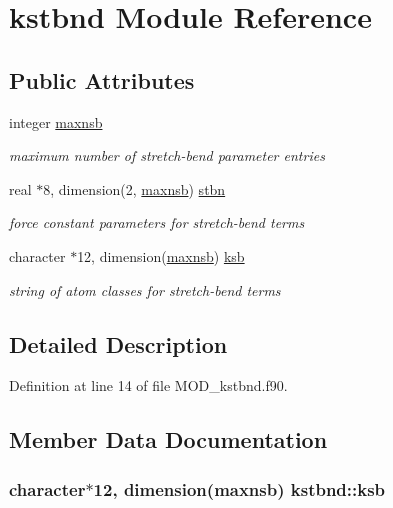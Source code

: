 \hypertarget{classkstbnd}{\section{kstbnd Module Reference}
\label{classkstbnd}
}
\subsection*{Public Attributes}
\begin{DoxyCompactItemize}
\item 
integer \hyperlink{classkstbnd_aa6a230189cca6d972b96f2ddb2e6d54c}{maxnsb}
\begin{DoxyCompactList}\small\item\em maximum number of stretch-\/bend parameter entries \end{DoxyCompactList}\item 
real $\ast$8, dimension(2, \hyperlink{classkstbnd_aa6a230189cca6d972b96f2ddb2e6d54c}{maxnsb}) \hyperlink{classkstbnd_a9712960c45399ccb7f0a8079f369d21a}{stbn}
\begin{DoxyCompactList}\small\item\em force constant parameters for stretch-\/bend terms \end{DoxyCompactList}\item 
character $\ast$12, dimension(\hyperlink{classkstbnd_aa6a230189cca6d972b96f2ddb2e6d54c}{maxnsb}) \hyperlink{classkstbnd_a14dbe5573f22e203527d7897affe52f2}{ksb}
\begin{DoxyCompactList}\small\item\em string of atom classes for stretch-\/bend terms \end{DoxyCompactList}\end{DoxyCompactItemize}


\subsection{Detailed Description}


Definition at line 14 of file M\-O\-D\-\_\-kstbnd.\-f90.



\subsection{Member Data Documentation}
\hypertarget{classkstbnd_a14dbe5573f22e203527d7897affe52f2}{
\subsubsection[{ksb}]{\setlength{\rightskip}{0pt plus 5cm}character$\ast$12, dimension({\bf maxnsb}) kstbnd\-::ksb}}\label{classkstbnd_a14dbe5573f22e203527d7897affe52f2}


